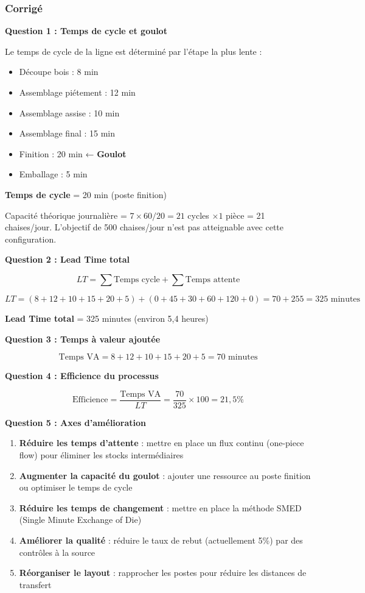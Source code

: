 \documentclass[a4paper,12pt]{article}
\begin{document}
\subsubsection{Corrigé}

\textbf{Question 1 : Temps de cycle et goulot}

Le temps de cycle de la ligne est déterminé par l'étape la plus lente :

\begin{itemize}
    \item Découpe bois : 8 min
    \item Assemblage piétement : 12 min
    \item Assemblage assise : 10 min
    \item Assemblage final : 15 min
    \item Finition : 20 min ← \textbf{Goulot}
    \item Emballage : 5 min
\end{itemize}

\textbf{Temps de cycle} = 20 min (poste finition)

Capacité théorique journalière = $7 \times 60 / 20 = 21$ cycles $\times 1$ pièce = 21 chaises/jour. L'objectif de 500 chaises/jour n'est pas atteignable avec cette configuration.

\textbf{Question 2 : Lead Time total}

\[
LT = \sum \text{Temps cycle} + \sum \text{Temps attente}
\]

\[
LT = (8+12+10+15+20+5) + (0+45+30+60+120+0) = 70 + 255 = 325 \text{ minutes}
\]

\textbf{Lead Time total} = 325 minutes (environ 5,4 heures)

\textbf{Question 3 : Temps à valeur ajoutée}

\[
\text{Temps VA} = 8 + 12 + 10 + 15 + 20 + 5 = 70 \text{ minutes}
\]

\textbf{Question 4 : Efficience du processus}

\[
\text{Efficience} = \frac{\text{Temps VA}}{LT} = \frac{70}{325} \times 100 = 21,5\%
\]

\textbf{Question 5 : Axes d'amélioration}

\begin{enumerate}
    \item \textbf{Réduire les temps d'attente} : mettre en place un flux continu (one-piece flow) pour éliminer les stocks intermédiaires
    \item \textbf{Augmenter la capacité du goulot} : ajouter une ressource au poste finition ou optimiser le temps de cycle
    \item \textbf{Réduire les temps de changement} : mettre en place la méthode SMED (Single Minute Exchange of Die)
    \item \textbf{Améliorer la qualité} : réduire le taux de rebut (actuellement 5\%) par des contrôles à la source
    \item \textbf{Réorganiser le layout} : rapprocher les postes pour réduire les distances de transfert
\end{enumerate}
\end{document}
